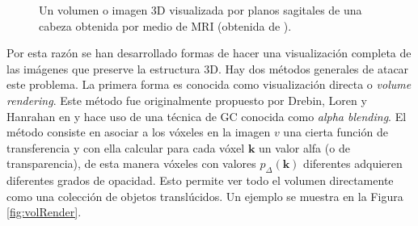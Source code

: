 \begin{figure}[htp]
\begin{center}
  \end{center}
  \caption[Un volumen o imagen 3D visualizada por planos sagitales de una cabeza obtenida por medio de MRI (obtenida de \cite{visualHumanSite})]{Un volumen o imagen 3D visualizada por planos sagitales de una cabeza obtenida por medio de MRI (obtenida de \cite{visualHumanSite}).}
  \label{fig:imagenDigital}
\end{figure}

Por esta razón se han desarrollado formas de hacer una visualización completa de las imágenes que preserve la estructura 3D. Hay dos métodos generales de atacar este problema. La primera forma es conocida como visualización directa o \emph{volume rendering}. Este método fue originalmente propuesto por Drebin, Loren y Hanrahan en \cite{VolumeRendering} y hace uso de una técnica de GC conocida como \emph{alpha blending}. El método consiste en asociar a los vóxeles en la imagen $v$ una cierta función de transferencia y con ella calcular para cada vóxel $\textbf{k}$ un valor alfa (o de transparencia), de esta manera vóxeles con valores $p_{\Delta}( \textbf{k} )$ diferentes adquieren diferentes grados de opacidad. Esto permite ver todo el volumen directamente como una colección de objetos translúcidos. Un ejemplo se muestra en la Figura \ref{fig:volRender}.

